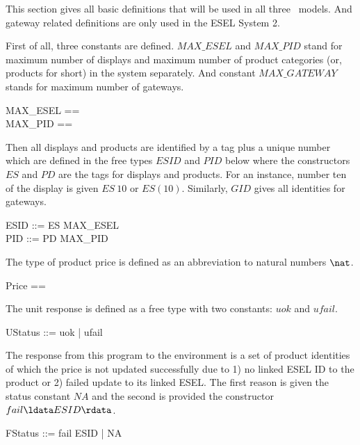 
This section gives all basic definitions that will be used in all three \Circus\ models. And gateway related definitions are only used in the ESEL System 2.

First of all, three constants are defined. $MAX\_ESEL$ and $MAX\_PID$ stand for maximum number of displays and maximum number of product categories (or, products for short) in the system separately. And constant $MAX\_GATEWAY$ stands for maximum number of gateways.
\begin{zed}
    MAX\_ESEL == \nat \\
\also    MAX\_PID == \nat
\end{zed}

Then all displays and products are identified by a tag plus a unique number which are defined in the free types $ESID$ and $PID$ below where the constructors $ES$ and $PD$ are the tags for displays and products. For an instance, number ten of the display is given $ES~10$ or $ES(10)$. Similarly, $GID$ gives all identities for gateways.
\begin{zed}
    ESID ::= ES  \upto MAX\_ESEL \rdata \\
    PID ::= PD  \upto MAX\_PID \rdata \\
\end{zed}


The type of product price is defined as an abbreviation to natural numbers $\nat$.
\begin{zed}
    Price == \nat
\end{zed}

The unit response is defined as a free type with two constants: $uok$ and $ufail$.
\begin{zed}
    UStatus ::= uok | ufail
\end{zed}

The response from this program to the environment is a set of product identities of which the price is not updated successfully due to 1) no linked ESEL ID to the product or 2) failed update to its linked ESEL. The first reason is given the status constant $NA$ and the second is provided the constructor $fail\ldata ESID \rdata$.
\begin{zed}
    FStatus ::= fail \ldata ESID \rdata | NA
\end{zed}

